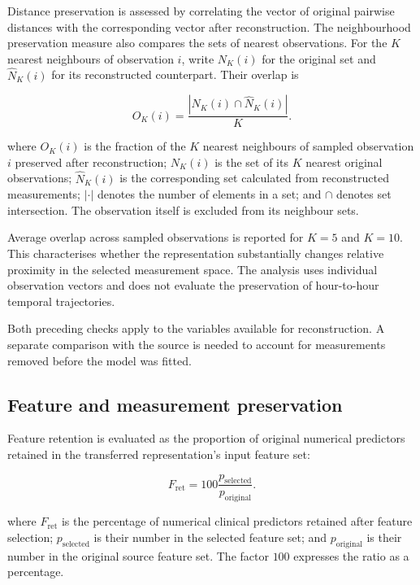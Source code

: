 \noindent Distance preservation is assessed by correlating the vector of original
pairwise distances with the corresponding vector after reconstruction.
The neighbourhood preservation measure also compares the sets of nearest
observations. For the \(K\) nearest neighbours of observation \(i\),
write \(N_K(i)\) for the original set and \(\hat N_K(i)\) for its
reconstructed counterpart. Their overlap is

\[
O_K(i)=
\frac{|N_K(i)\cap\hat N_K(i)|}{K}.\tag{3.8.6}
\]

\noindent where \(O_K(i)\) is the fraction of the \(K\) nearest neighbours of
sampled observation \(i\) preserved after reconstruction; \(N_K(i)\) is
the set of its \(K\) nearest original observations; \(\hat N_K(i)\) is
the corresponding set calculated from reconstructed measurements;
\(|\cdot|\) denotes the number of elements in a set; and \(\cap\)
denotes set intersection. The observation itself is excluded from its
neighbour sets.

\noindent Average overlap across sampled observations is reported for \(K=5\) and
\(K=10\). This characterises whether the representation substantially
changes relative proximity in the selected measurement space. The
analysis uses individual observation vectors and does not evaluate the
preservation of hour-to-hour temporal trajectories.

\noindent Both preceding checks apply to the variables available for reconstruction. A separate comparison with the source is needed to account for measurements removed before the model was fitted.

\subsection{Feature and measurement preservation}\label{feature-and-measurement-preservation}

Feature retention is evaluated as the proportion of original numerical
predictors retained in the transferred representation's input feature
set:

\[
F_{\mathrm{ret}}=
100\frac{p_{\mathrm{selected}}}{p_{\mathrm{original}}}.\tag{3.8.7}
\]

\noindent where \(F_{\mathrm{ret}}\) is the percentage of numerical clinical
predictors retained after feature selection; \(p_{\mathrm{selected}}\)
is their number in the selected feature set; and
\(p_{\mathrm{original}}\) is their number in the original source feature
set. The factor \(100\) expresses the ratio as a percentage.

